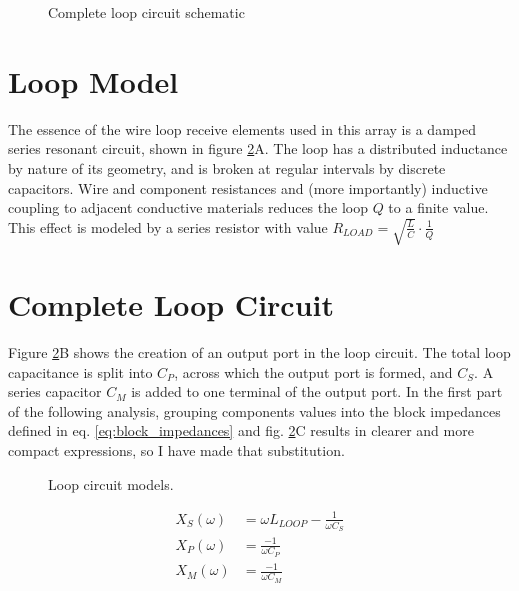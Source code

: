\begin{figure}
    \centering
    
    \caption{Complete loop circuit schematic}
    \label{fig:loop_schematic}
\end{figure}

\section{Loop Model}
The essence of the wire loop receive elements used in this array is a damped series resonant circuit, shown in figure
\ref{fig:loop_model}A. The loop has a distributed inductance by nature of its geometry, and is broken at regular
intervals by discrete capacitors.  Wire and component resistances and (more importantly) inductive coupling to adjacent
conductive materials reduces the loop $Q$ to a finite value. This effect is modeled by a series resistor with value
$R_{LOAD}=\sqrt{\frac{L}{C}}\cdot\frac{1}{Q}$

\section{Complete Loop Circuit}
Figure \ref{fig:loop_model}B shows the creation of an output port in the loop circuit. The total loop capacitance is
split into $C_P$, across which the output port is formed, and $C_S$. A series capacitor $C_M$ is added to one terminal
of the output port. In the first part of the following analysis, grouping components values into the block impedances
defined in eq. \ref{eq:block_impedances} and fig. \ref{fig:loop_model}C results in clearer and more compact
expressions, so I have made that substitution.

\begin{figure}
    \centering
    
    \caption{Loop circuit models.}
    \label{fig:loop_model}
\end{figure}

\begin{equation}\label{eq:block_impedances}
    \begin{aligned}
        X_S(\omega) &= \omega L_{LOOP} - \frac{1}{\omega C_S}\\
        X_P(\omega) &= \frac{-1}{\omega C_P}\\
        X_M(\omega) &= \frac{-1}{\omega C_M}\\
    \end{aligned}
\end{equation}


